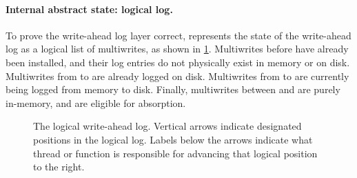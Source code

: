 


\paragraph{Internal abstract state: logical log.}
To prove the write-ahead log layer correct, \txn represents the
state of the write-ahead log as a logical list of multiwrites, as
shown in \cref{fig:log}.  Multiwrites before  have
already been installed, and their log entries do not physically exist in memory or on disk.
Multiwrites from  to  are already logged on
disk.  Multiwrites from  to  are currently being logged
from memory to disk.  Finally, multiwrites between 
and  are purely in-memory, and are eligible for absorption.

\begin{figure}[ht]
    
    \vspace{-\baselineskip}
    \caption{The logical write-ahead log.  Vertical arrows indicate
        designated positions in the logical log.  Labels below the arrows
        indicate what thread or function is responsible for advancing
        that logical position to the right.}
    \label{fig:log}
\end{figure}

